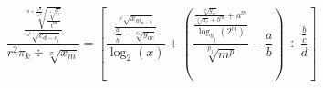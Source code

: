 \documentclass[11pt,a4paper]{beamer}
\begin{document}
\begin{frame}
$$\frac{\frac{\sqrt[n+\frac{\sqrt[n]{4}}{m^4}]{\frac{\sqrt[z]{^{g_j}}}{t^m}}}{\sqrt[a^{b+1}]{c_{d-e_i}}}}{r^2\pi _k\div \sqrt[\pi ]{x_m}}=\left[\frac{\frac{\sqrt[p^{j^{i+1}}]{x_{m_{n\div 2}}}}{\frac{a_i}{b^j}-\sqrt[x_k]{y_{ac}}}}{\log _2\left(x\right)}+\left(\frac{\frac{\frac{\sqrt[x^p]{y_w}}{\sqrt[f]{a_c}+b^m}+a^m}{\log _{h_j}\left(2^m\right)}}{\sqrt[p_j]{m^p}}-\frac{a}{b}\right)\div \frac{\frac{b}{c}}{d}\right]$$
\end{frame}
\end{document}
